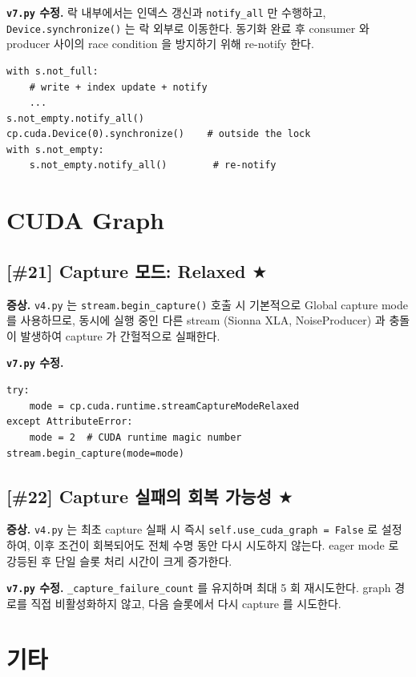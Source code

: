 \documentclass[11pt,a4paper]{article}
\newcommand{\sone}{\textcolor{starcolor}{$\bigstar$}}
\newcommand{\vfour}{\texttt{v4.py}}
\newcommand{\vseven}{\texttt{v7.py}}
\newcommand{\bugitem}[3]{%
  \subsection{[\##1] #2 \hfill #3}%
  \vspace{-0.5em}%
}
\begin{document}
\textbf{\vseven{} 수정.} 락 내부에서는 인덱스 갱신과 \texttt{notify\_all}
만 수행하고, \texttt{Device.synchronize()} 는 락 외부로 이동한다. 동기화
완료 후 consumer 와 producer 사이의 race condition 을 방지하기 위해
re-notify 한다.
\begin{verbatim}
with s.not_full:
    # write + index update + notify
    ...
s.not_empty.notify_all()
cp.cuda.Device(0).synchronize()    # outside the lock
with s.not_empty:
    s.not_empty.notify_all()        # re-notify
\end{verbatim}

\section{CUDA Graph}
\label{sec:cudagraph}

\bugitem{21}{Capture 모드: Relaxed}{\sone}

\textbf{증상.} \vfour{} 는 \texttt{stream.begin\_capture()} 호출 시 기본적으로
Global capture mode 를 사용하므로, 동시에 실행 중인 다른 stream
(Sionna XLA, NoiseProducer) 과 충돌이 발생하여 capture 가 간헐적으로 실패한다.

\textbf{\vseven{} 수정.}
\begin{verbatim}
try:
    mode = cp.cuda.runtime.streamCaptureModeRelaxed
except AttributeError:
    mode = 2  # CUDA runtime magic number
stream.begin_capture(mode=mode)
\end{verbatim}

\bugitem{22}{Capture 실패의 회복 가능성}{\sone}

\textbf{증상.} \vfour{} 는 최초 capture 실패 시 즉시
\texttt{self.use\_cuda\_graph = False} 로 설정하여, 이후 조건이 회복되어도
전체 수명 동안 다시 시도하지 않는다. eager mode 로 강등된 후 단일 슬롯
처리 시간이 크게 증가한다.

\textbf{\vseven{} 수정.} \texttt{\_capture\_failure\_count} 를 유지하며
최대 5 회 재시도한다. graph 경로를 직접 비활성화하지 않고, 다음 슬롯에서
다시 capture 를 시도한다.

\section{기타}
\label{sec:misc}
\end{document}
